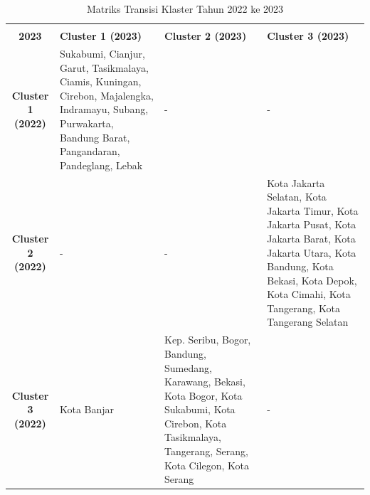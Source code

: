 \begin{table}[H]
\centering
\caption{Matriks Transisi Klaster Tahun 2022 ke 2023} \label{tab:transisi_2022_2023}
\begin{tabular}{|c|p{2cm}|p{2cm}|p{2cm}|}
\hline
\makecell{\textbf{Tahun 2022} \\ \textbf{2023}} & \textbf{Cluster 1 (2023)} & \textbf{Cluster 2 (2023)} & \textbf{Cluster 3 (2023)} \\ \hline
\textbf{Cluster 1 (2022)} & Sukabumi, Cianjur, Garut, Tasikmalaya, Ciamis, Kuningan, Cirebon, Majalengka, Indramayu, Subang, Purwakarta, Bandung Barat, Pangandaran, Pandeglang, Lebak & - & - \\ \hline
\textbf{Cluster 2 (2022)} & - & - & Kota Jakarta Selatan, Kota Jakarta Timur, Kota Jakarta Pusat, Kota Jakarta Barat, Kota Jakarta Utara, Kota Bandung, Kota Bekasi, Kota Depok, Kota Cimahi, Kota Tangerang, Kota Tangerang Selatan \\ \hline
\textbf{Cluster 3 (2022)} & Kota Banjar & Kep. Seribu, Bogor, Bandung, Sumedang, Karawang, Bekasi, Kota Bogor, Kota Sukabumi, Kota Cirebon, Kota Tasikmalaya, Tangerang, Serang, Kota Cilegon, Kota Serang & - \\ \hline
\end{tabular}
\end{table}